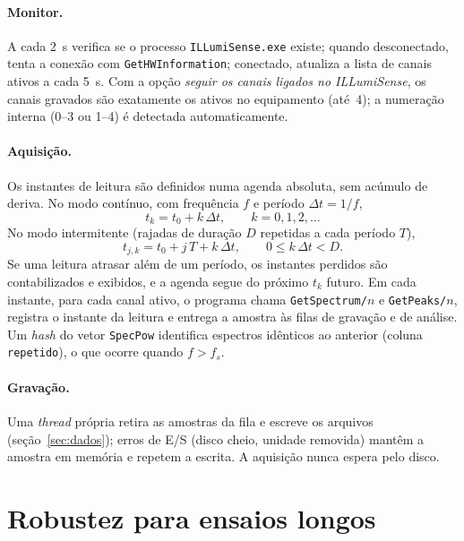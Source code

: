 \documentclass[11pt,a4paper]{article}
\begin{document}
\paragraph{Monitor.} A cada 2~s verifica se o processo \texttt{ILLumiSense.exe} existe; quando
desconectado, tenta a conexão com \texttt{GetHWInformation}; conectado, atualiza a lista de canais
ativos a cada 5~s. Com a opção \emph{seguir os canais ligados no ILLumiSense}, os canais gravados são
exatamente os ativos no equipamento (até~4); a numeração interna (0--3 ou 1--4) é detectada
automaticamente.

\paragraph{Aquisição.} Os instantes de leitura são definidos numa agenda absoluta, sem acúmulo de
deriva. No modo contínuo, com frequência $f$ e período $\Delta t = 1/f$,
\begin{equation}
t_k = t_0 + k\,\Delta t,\qquad k = 0,1,2,\dots
\label{eq:agenda}
\end{equation}
No modo intermitente (rajadas de duração $D$ repetidas a cada período $T$),
\begin{equation}
t_{j,k} = t_0 + j\,T + k\,\Delta t,\qquad 0 \le k\,\Delta t < D .
\label{eq:rajada}
\end{equation}
Se uma leitura atrasar além de um período, os instantes perdidos são contabilizados e exibidos, e a
agenda segue do próximo $t_k$ futuro. Em cada instante, para cada canal ativo, o programa chama
\texttt{GetSpectrum/}$n$ e \texttt{GetPeaks/}$n$, registra o instante da leitura e entrega a
amostra às filas de gravação e de análise. Um \emph{hash} do vetor \texttt{SpecPow} identifica
espectros idênticos ao anterior (coluna \texttt{repetido}), o que ocorre quando $f > f_s$.

\paragraph{Gravação.} Uma \emph{thread} própria retira as amostras da fila e escreve os arquivos
(seção~\ref{sec:dados}); erros de E/S (disco cheio, unidade removida) mantêm a amostra em memória e
repetem a escrita. A aquisição nunca espera pelo disco.

\section{Robustez para ensaios longos}
\label{sec:robustez}
\end{document}
